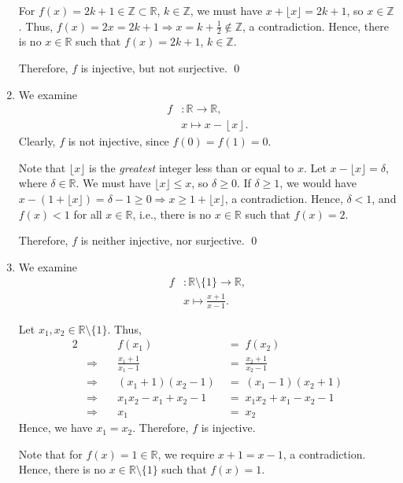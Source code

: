 \documentclass[10pt]{article}
\begin{document}
\begin{enumerate}
		For $f(x) = 2k + 1 \in \mathbb{Z} \subset \mathbb{R}$, $k \in \mathbb{Z}$, we must have $x + \lfloor x \rfloor = 2k + 1$, so 
		$x \in \mathbb{Z}$. Thus, $f(x) = 2x = 2k + 1 \Rightarrow x = k + \frac{1}{2} \notin \mathbb{Z}$, a contradiction. Hence, there
		is no $x \in \mathbb{R}$ such that $f(x) = 2k + 1$, $k \in \mathbb{Z}$.
		
		Therefore, $f$ is injective, but not surjective. \qed
		
		\item We examine
		\begin{align*}
			f&: \mathbb{R} \to \mathbb{R},\\
			&x \mapsto x - \left\lfloor x \right\rfloor .
		\end{align*}
		Clearly, $f$ is not injective, since $f(0) = f(1) = 0$.
		
		Note that $\lfloor x\rfloor$ is the \textit{greatest} integer less than or equal to $x$.
		Let $x - \lfloor x\rfloor = \delta$, where $\delta \in \mathbb{R}$.
		We must have $\lfloor x\rfloor \leq x$, so $\delta \geq 0$.
		If $\delta \geq 1$, we would have 
		$x - (1 + \lfloor x\rfloor) = \delta - 1 \geq 0 \Rightarrow x \geq 1 + \lfloor x\rfloor$, a contradiction.
		Hence, $\delta < 1$, and $f(x) < 1$ for all $x \in \mathbb{R}$, i.e., there is no $x \in \mathbb{R}$ such that $f(x) = 2$.
		
		Therefore, $f$ is neither injective, nor surjective. \qed
		
		\item We examine
		\begin{align*}
			f&: \mathbb{R}\setminus\{1\} \to \mathbb{R},\\
			&x \mapsto \frac{x+1}{x-1} .
		\end{align*}
		
		Let $x_1, x_2 \in \mathbb{R}\setminus\{1\}$. Thus,
		\begin{alignat*}{2}
			&&f(x_1) \;&=\; f(x_2) \\
			&\Rightarrow\quad& \frac{x_1 + 1}{x_1 - 1}  \;&=\; \frac{x_2 + 1}{x_2 - 1} \\
			&\Rightarrow\quad& (x_1 + 1)(x_2 - 1)  \;&=\; (x_1 - 1)(x_2 + 1) \tag{$x \neq 1$} \\
			&\Rightarrow\quad& x_1x_2 - x_1 + x_2  - 1 \;&=\; x_1x_2 + x_1 - x_2 - 1\\ 
			&\Rightarrow\quad& x_1 \;&=\; x_2
		\end{alignat*}
		Hence, we have $x_1 = x_2$. Therefore, $f$ is injective.
		
		Note that for $f(x) = 1 \in \mathbb{R}$, we require $x + 1 = x - 1$, a contradiction. Hence, there is no
		$x \in \mathbb{R}\setminus\{1\}$ such that $f(x) = 1$.
		

\end{enumerate}
\end{document}
